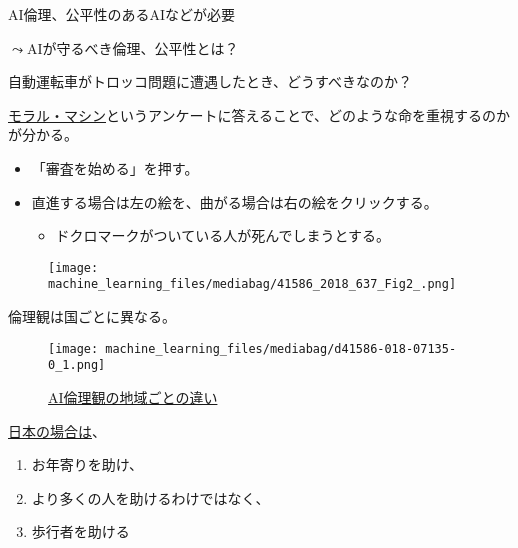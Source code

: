 \documentclass[
  xelatex,
  ja=standard]{bxjsarticle}
\providecommand{\tightlist}{%
  \setlength{\itemsep}{0pt}\setlength{\parskip}{0pt}}\usepackage{longtable,booktabs,array}
\begin{document}
AI倫理、公平性のあるAIなどが必要

\(\leadsto\)AIが守るべき倫理、公平性とは？

自動運転車がトロッコ問題に遭遇したとき、どうすべきなのか？

\href{https://www.moralmachine.net/hl/ja}{モラル・マシン}というアンケートに答えることで、どのような命を重視するのかが分かる。

\begin{itemize}
\tightlist
\item
  「審査を始める」を押す。
\item
  直進する場合は左の絵を、曲がる場合は右の絵をクリックする。

  \begin{itemize}
  \tightlist
  \item
    ドクロマークがついている人が死んでしまうとする。
  \end{itemize}
\end{itemize}

\begin{figure}[htpb]

{\centering \texttt{[image: machine\_learning\_files/mediabag/41586\_2018\_637\_Fig2\_.png]}

}

\caption{\citet{awad2018}}

\end{figure}

倫理観は国ごとに異なる。

\begin{figure}[htpb]

{\centering \texttt{[image: machine\_learning\_files/mediabag/d41586-018-07135-0\_1.png]}

}

\caption{\href{https://www.nature.com/articles/d41586-018-07135-0}{AI倫理観の地域ごとの違い}}

\end{figure}

\href{https://www.technologyreview.com/2018/10/24/139313/a-global-ethics-study-aims-to-help-ai-solve-the-self-driving-trolley-problem/}{日本の場合は}、

\begin{enumerate}
\def\labelenumi{\arabic{enumi}.}
\tightlist
\item
  お年寄りを助け、
\item
  より多くの人を助けるわけではなく、
\item
  歩行者を助ける
\end{enumerate}
\end{document}
